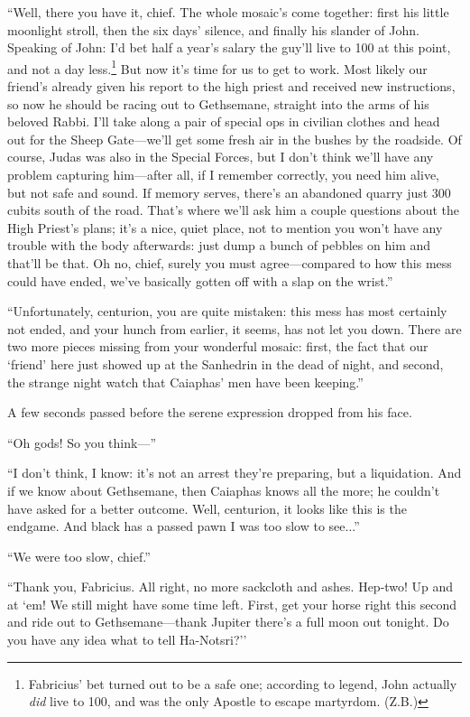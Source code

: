 ``Well, there you have it, chief. The whole mosaic's come together: first his little moonlight stroll, then the six days' silence, and finally his slander of John. Speaking of John: I'd bet half a year's salary the guy'll live to 100 at this point, and not a day less.\footnote{Fabricius' bet turned out to be a safe one; according to legend, John actually \emph{did} live to 100, and was
the only Apostle to escape martyrdom. (Z.B.)} But now it's time for us to get to work. Most likely our friend's already given his report to the high priest and received new instructions, so now he should be racing out to Gethsemane, straight into the arms of his beloved Rabbi. I'll take along a pair of special ops in civilian clothes and head out for the Sheep Gate---we'll get some fresh air in the bushes by the roadside. Of course, Judas was also in the Special Forces, but I don't think we'll have any problem capturing him---after all, if I remember correctly, you need him alive, but not safe and sound. If memory serves, there's an abandoned quarry just 300 cubits south of the road. That's where we'll ask him a couple questions about the High Priest's plans; it's a nice, quiet place, not to mention you won't have any trouble with the body afterwards: just dump a bunch of pebbles on him and that'll be that. Oh no, chief, surely you must agree---compared to how this mess could have ended, we've basically gotten off with a slap on the wrist.''

``Unfortunately, centurion, you are quite mistaken: this mess has most certainly not ended, and your hunch from earlier, it seems, has not let you down. There are two more pieces missing from your wonderful mosaic: first, the fact that our `friend' here just showed up at the Sanhedrin in the dead of night, and second, the strange night watch that Caiaphas' men have been keeping.''

A few seconds passed before the serene expression dropped from his face.

``Oh gods! So you think---''

``I don't think, I know: it's not an arrest they're preparing, but a liquidation. And if we know about Gethsemane, then Caiaphas knows all the more; he couldn't have asked for a better outcome. Well, centurion, it looks like this is the endgame. And black has a passed pawn I was too slow to see...''

``We were too slow, chief.''

``Thank you, Fabricius. All right, no more sackcloth and ashes. Hep-two! Up and at `em! We still might have some time left. First, get your horse right this second and ride out to Gethsemane---thank Jupiter there's a full moon out tonight. Do you have any idea what to tell Ha-Notsri?''

